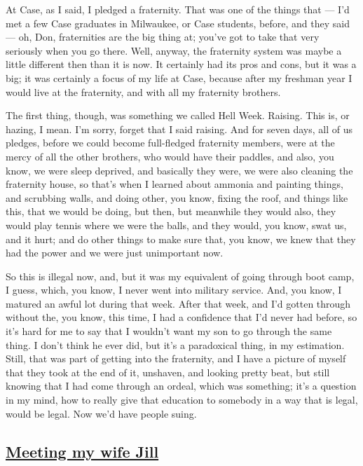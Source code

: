 \documentclass[]{article}
\begin{document}
At Case, as I said, I pledged a fraternity. That was one of the things
that --- I'd met a few Case graduates in Milwaukee, or Case students,
before, and they said --- oh, Don, fraternities are the big thing at;
you've got to take that very seriously when you go there. Well, anyway,
the fraternity system was maybe a little different then than it is now.
It certainly had its pros and cons, but it was a big; it was certainly a
focus of my life at Case, because after my freshman year I would live at
the fraternity, and with all my fraternity brothers.

The first thing, though, was something we called Hell Week. Raising.
This is, or hazing, I mean. I'm sorry, forget that I said raising. And
for seven days, all of us pledges, before we could become full-fledged
fraternity members, were at the mercy of all the other brothers, who
would have their paddles, and also, you know, we were sleep deprived,
and basically they were, we were also cleaning the fraternity house, so
that's when I learned about ammonia and painting things, and scrubbing
walls, and doing other, you know, fixing the roof, and things like this,
that we would be doing, but then, but meanwhile they would also, they
would play tennis where we were the balls, and they would, you know,
swat us, and it hurt; and do other things to make sure that, you know,
we knew that they had the power and we were just unimportant now.

So this is illegal now, and, but it was my equivalent of going through
boot camp, I guess, which, you know, I never went into military service.
And, you know, I matured an awful lot during that week. After that week,
and I'd gotten through without the, you know, this time, I had a
confidence that I'd never had before, so it's hard for me to say that I
wouldn't want my son to go through the same thing. I don't think he ever
did, but it's a paradoxical thing, in my estimation. Still, that was
part of getting into the fraternity, and I have a picture of myself that
they took at the end of it, unshaven, and looking pretty beat, but still
knowing that I had come through an ordeal, which was something; it's a
question in my mind, how to really give that education to somebody in a
way that is legal, would be legal. Now we'd have people suing.

\subsection{\texorpdfstring{\href{http://webofstories.com/play/17072}{Meeting
my wife Jill}}{Meeting my wife Jill}}\label{meeting-my-wife-jill}
\end{document}
